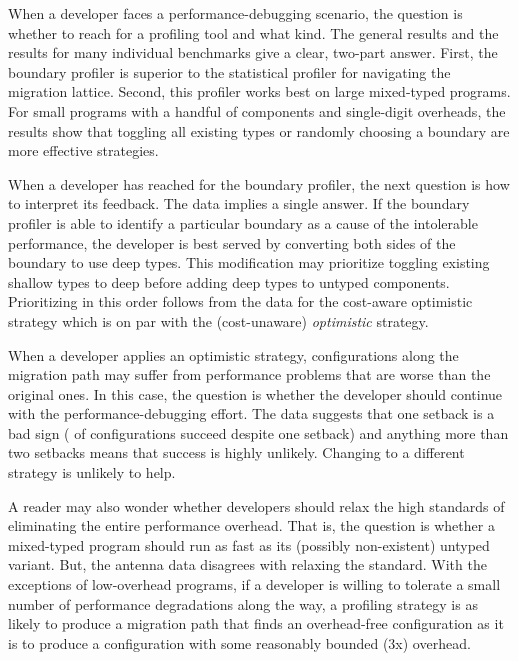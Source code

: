 When a developer faces a performance-debugging scenario, the question is
whether to reach for a profiling tool and what kind. The general results and the
results for many individual benchmarks give a clear, two-part answer.
First, the boundary profiler is superior to the statistical profiler for
navigating the migration lattice.
Second, this profiler works best on large mixed-typed programs.
For small programs with a handful of components and single-digit overheads,
the results show that toggling all existing types or randomly choosing a
boundary are more effective strategies.

When a developer has reached for the boundary profiler, the next question is how
to interpret its feedback. The data implies a single
answer.  If the boundary profiler is able to identify a particular boundary as a
cause of the intolerable performance, the developer is best served by
converting both sides of the boundary to use deep types. This modification
may prioritize toggling existing shallow types to deep before adding deep
types to untyped components. Prioritizing in this order follows from the data
for the cost-aware optimistic strategy which is on par with the (cost-unaware)
\emph{optimistic} strategy.

When a developer applies an optimistic strategy, configurations
along the migration path may suffer from performance problems that are
worse than the original ones. In this case, the question is whether the
developer should continue with the performance-debugging effort. The data
suggests that one setback is a bad sign ( of configurations
succeed despite one setback) and anything more than two setbacks means
that success is highly unlikely.  Changing to a different strategy is
unlikely to help.

A reader may also wonder whether developers should relax the high
standards of eliminating the entire performance overhead.  That is, the
question is whether a mixed-typed program should run as fast as its
(possibly non-existent) untyped variant. But, the antenna data disagrees
with relaxing the standard. With the exceptions of low-overhead programs,
if a developer is willing to tolerate a small number of performance
degradations along the way, a profiling strategy is as likely to produce
a migration path that finds an overhead-free configuration as it is to
produce a configuration with some reasonably bounded ($3$x) overhead.


